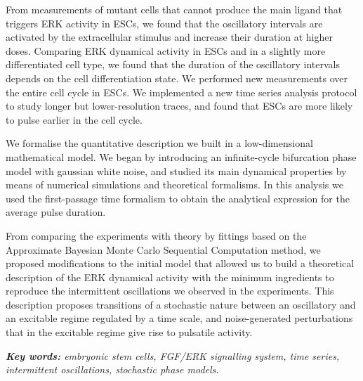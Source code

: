\documentclass[./main.tex]{subfiles}
\begin{document}
From measurements of mutant cells that cannot produce the main ligand that triggers ERK activity in ESCs, we found that the oscillatory intervals are activated by the extracellular stimulus and increase their duration at higher doses. Comparing ERK dynamical activity in ESCs and in a slightly more differentiated cell type, we found that the duration of the oscillatory intervals depends on the cell differentiation state. We performed new measurements over the entire cell cycle in ESCs. We implemented a new time series analysis protocol to study longer but lower-resolution traces, and found that ESCs are more likely to pulse earlier in the cell cycle.


We formalise the quantitative description we built in a low-dimensional mathematical model. We began by introducing an infinite-cycle bifurcation phase model with gaussian white noise, and studied its main dynamical properties by means of numerical simulations and theoretical formalisms. In this analysis we used the first-passage time formalism to obtain the analytical expression for the average pulse duration.

From comparing the experiments with theory by fittings based on the Approximate Bayesian Monte Carlo Sequential Computation method, we proposed modifications to the initial model that allowed us to build a theoretical description of the ERK dynamical activity with the minimum ingredients to reproduce the intermittent oscillations we observed in the experiments. This description proposes transitions of a stochastic nature between an oscillatory and an excitable regime regulated by a time scale, and noise-generated perturbations that in the excitable regime give rise to pulsatile activity.

\vspace{0.5cm}


\textit{\textbf{Key words:} embryonic stem cells, FGF/ERK signalling system, time series, intermittent oscillations, stochastic phase models.}
\end{document}
